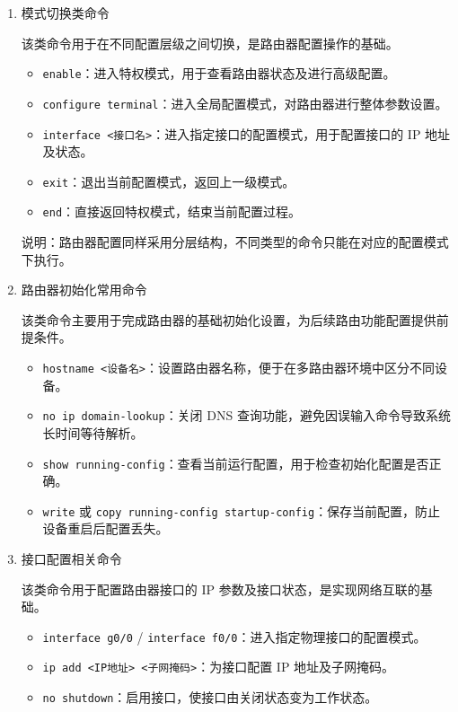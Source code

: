 \documentclass[UTF8,12pt,a4paper]{ctexart}
\begin{document}
\begin{enumerate}[label=（\arabic*）, leftmargin=2em, itemsep=1em]

  \item {\heiti 模式切换类命令}

  该类命令用于在不同配置层级之间切换，是路由器配置操作的基础。

  \begin{itemize}
    \item \texttt{enable}：进入特权模式，用于查看路由器状态及进行高级配置。
    \item \texttt{configure terminal}：进入全局配置模式，对路由器进行整体参数设置。
    \item \texttt{interface <接口名>}：进入指定接口的配置模式，用于配置接口的 IP 地址及状态。
    \item \texttt{exit}：退出当前配置模式，返回上一级模式。
    \item \texttt{end}：直接返回特权模式，结束当前配置过程。
  \end{itemize}

  {\heiti 说明：}路由器配置同样采用分层结构，不同类型的命令只能在对应的配置模式下执行。

  \item {\heiti 路由器初始化常用命令}

  该类命令主要用于完成路由器的基础初始化设置，为后续路由功能配置提供前提条件。

  \begin{itemize}
    \item \texttt{hostname <设备名>}：设置路由器名称，便于在多路由器环境中区分不同设备。
    \item \texttt{no ip domain-lookup}：关闭 DNS 查询功能，避免因误输入命令导致系统长时间等待解析。
    \item \texttt{show running-config}：查看当前运行配置，用于检查初始化配置是否正确。
    \item \texttt{write} 或 \texttt{copy running-config startup-config}：保存当前配置，防止设备重启后配置丢失。
  \end{itemize}

  \item {\heiti 接口配置相关命令}

  该类命令用于配置路由器接口的 IP 参数及接口状态，是实现网络互联的基础。

  \begin{itemize}
    \item \texttt{interface g0/0} / \texttt{interface f0/0}：进入指定物理接口的配置模式。
    \item \texttt{ip add <IP地址> <子网掩码>}：为接口配置 IP 地址及子网掩码。
    \item \texttt{no shutdown}：启用接口，使接口由关闭状态变为工作状态。
  \end{itemize}


\end{enumerate}
\end{document}
